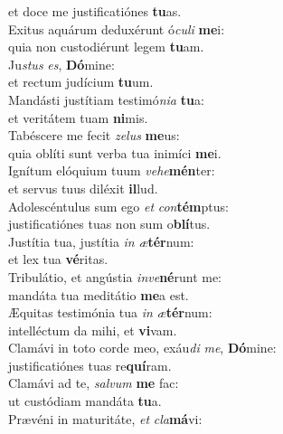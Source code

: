 \oddverse et doce me justificatiónes \textbf{tu}as.\\
\evenverse Exitus aquárum deduxérunt ó\textit{cu}\textit{li} \textbf{me}i:~\*\\
\evenverse quia non custodiérunt legem \textbf{tu}am.\\
\oddverse Ju\textit{stus} \textit{es}, \textbf{Dó}mine:~\*\\
\oddverse et rectum judícium \textbf{tu}um.\\
\evenverse Mandásti justítiam testimó\textit{ni}\textit{a} \textbf{tu}a:~\*\\
\evenverse et veritátem tuam \textbf{ni}mis.\\
\oddverse Tabéscere me fecit \textit{ze}\textit{lus} \textbf{me}us:~\*\\
\oddverse quia oblíti sunt verba tua inimíci \textbf{me}i.\\
\evenverse Ignítum elóquium tuum \textit{ve}\textit{he}\textbf{mén}ter:~\*\\
\evenverse et servus tuus diléxit \textbf{il}lud.\\
\oddverse Adolescéntulus sum ego \textit{et} \textit{con}\textbf{tém}ptus:~\*\\
\oddverse justificatiónes tuas non sum o\textbf{blí}tus.\\
\evenverse Justítia tua, justítia \textit{in} \textit{æ}\textbf{tér}num:~\*\\
\evenverse et lex tua \textbf{vé}ritas.\\
\oddverse Tribulátio, et angústia \textit{in}\textit{ve}\textbf{né}runt me:~\*\\
\oddverse mandáta tua meditátio \textbf{me}a est.\\
\evenverse Æquitas testimónia tua \textit{in} \textit{æ}\textbf{tér}num:~\*\\
\evenverse intelléctum da mihi, et \textbf{vi}vam.\\
\oddverse Clamávi in toto corde meo, exáu\textit{di} \textit{me}, \textbf{Dó}mine:~\*\\
\oddverse justificatiónes tuas re\textbf{quí}ram.\\
\evenverse Clamávi ad te, \textit{sal}\textit{vum} \textbf{me} fac:~\*\\
\evenverse ut custódiam mandáta \textbf{tu}a.\\
\oddverse Prævéni in maturitáte, \textit{et} \textit{cla}\textbf{má}vi:~\*\\
